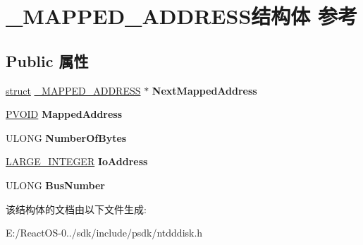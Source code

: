 \hypertarget{struct___m_a_p_p_e_d___a_d_d_r_e_s_s}{}\section{\+\_\+\+M\+A\+P\+P\+E\+D\+\_\+\+A\+D\+D\+R\+E\+S\+S结构体 参考}
\label{struct___m_a_p_p_e_d___a_d_d_r_e_s_s}
\subsection*{Public 属性}
\begin{DoxyCompactItemize}
\item 
\mbox{\label{struct___m_a_p_p_e_d___a_d_d_r_e_s_s_a412b95474931d66e395f0326902923cf}} 
\hyperlink{interfacestruct}{struct} \hyperlink{struct___m_a_p_p_e_d___a_d_d_r_e_s_s}{\+\_\+\+M\+A\+P\+P\+E\+D\+\_\+\+A\+D\+D\+R\+E\+SS} $\ast$ {\bfseries Next\+Mapped\+Address}
\item 
\mbox{\label{struct___m_a_p_p_e_d___a_d_d_r_e_s_s_add9c0f3fef9c8a3f7562e393c4d93a21}} 
\hyperlink{interfacevoid}{P\+V\+O\+ID} {\bfseries Mapped\+Address}
\item 
\mbox{\label{struct___m_a_p_p_e_d___a_d_d_r_e_s_s_aea422fcc1e6c3359a41d00650322e944}} 
U\+L\+O\+NG {\bfseries Number\+Of\+Bytes}
\item 
\mbox{\label{struct___m_a_p_p_e_d___a_d_d_r_e_s_s_a5154671bcf583000ece5c45b86260b05}} 
\hyperlink{union___l_a_r_g_e___i_n_t_e_g_e_r}{L\+A\+R\+G\+E\+\_\+\+I\+N\+T\+E\+G\+ER} {\bfseries Io\+Address}
\item 
\mbox{\label{struct___m_a_p_p_e_d___a_d_d_r_e_s_s_a3bf4358ecca14e2413b9bfd5d213c42f}} 
U\+L\+O\+NG {\bfseries Bus\+Number}
\end{DoxyCompactItemize}


该结构体的文档由以下文件生成\+:\begin{DoxyCompactItemize}
\item 
E\+:/\+React\+O\+S-\/0../sdk/include/psdk/ntdddisk.\+h\end{DoxyCompactItemize}

